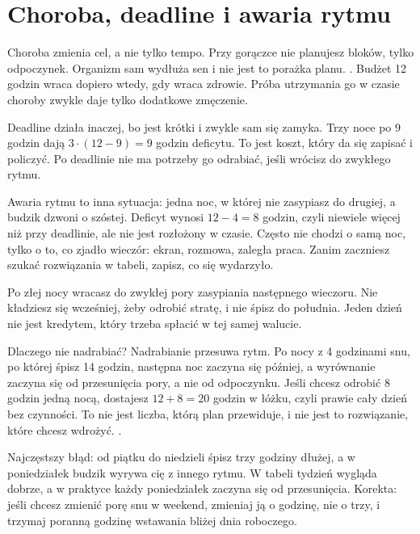 \section{Choroba, deadline i awaria rytmu}

Choroba zmienia cel, a nie tylko tempo. Przy gorączce nie planujesz bloków, tylko odpoczynek. Organizm sam wydłuża sen i nie jest to porażka planu. . Budżet 12 godzin wraca dopiero wtedy, gdy wraca zdrowie. Próba utrzymania go w czasie choroby zwykle daje tylko dodatkowe zmęczenie.

Deadline działa inaczej, bo jest krótki i zwykle sam się zamyka. Trzy noce po 9 godzin dają $3 \cdot (12 - 9) = 9$ godzin deficytu. To jest koszt, który da się zapisać i policzyć. Po deadlinie nie ma potrzeby go odrabiać, jeśli wrócisz do zwykłego rytmu.

Awaria rytmu to inna sytuacja: jedna noc, w której nie zasypiasz do drugiej, a budzik dzwoni o szóstej. Deficyt wynosi $12 - 4 = 8$ godzin, czyli niewiele więcej niż przy deadlinie, ale nie jest rozłożony w czasie. Często nie chodzi o samą noc, tylko o to, co zjadło wieczór: ekran, rozmowa, zaległa praca. Zanim zaczniesz szukać rozwiązania w tabeli, zapisz, co się wydarzyło.

\begin{zasada}
Po złej nocy wracasz do zwykłej pory zasypiania następnego wieczoru. Nie kładziesz się wcześniej, żeby odrobić stratę, i nie śpisz do południa. Jeden dzień nie jest kredytem, który trzeba spłacić w tej samej walucie.
\end{zasada}

Dlaczego nie nadrabiać? Nadrabianie przesuwa rytm. Po nocy z 4 godzinami snu, po której śpisz 14 godzin, następna noc zaczyna się później, a wyrównanie zaczyna się od przesunięcia pory, a nie od odpoczynku. Jeśli chcesz odrobić 8 godzin jedną nocą, dostajesz $12 + 8 = 20$ godzin w łóżku, czyli prawie cały dzień bez czynności. To nie jest liczba, którą plan przewiduje, i nie jest to rozwiązanie, które chcesz wdrożyć. .

\begin{falle}
Najczęstszy błąd: od piątku do niedzieli śpisz trzy godziny dłużej, a w poniedziałek budzik wyrywa cię z innego rytmu. W tabeli tydzień wygląda dobrze, a w praktyce każdy poniedziałek zaczyna się od przesunięcia. Korekta: jeśli chcesz zmienić porę snu w weekend, zmieniaj ją o godzinę, nie o trzy, i trzymaj poranną godzinę wstawania bliżej dnia roboczego.
\end{falle}

